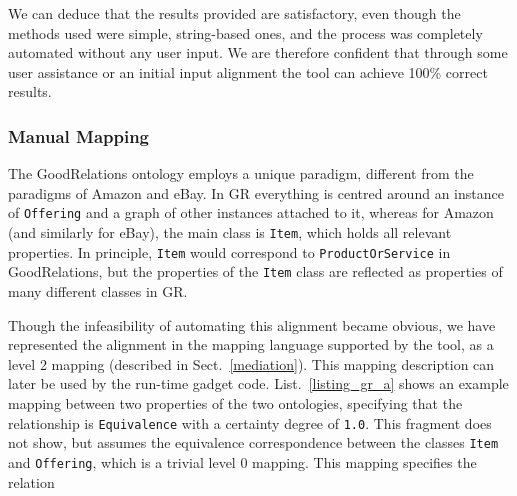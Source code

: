 We can deduce that the results provided are satisfactory, even though the methods used were simple, string-based ones, and the process was completely automated without any user input.
We are therefore confident that through some user assistance or an initial input alignment the tool can achieve 100\% correct results.



\subsubsection{Manual Mapping} %
\label{sub:manual_mapping}

The GoodRelations ontology employs a unique paradigm, different from the paradigms of Amazon and eBay. In GR everything is centred around an instance of \texttt{Offering} and a graph of other instances attached to it, whereas for Amazon (and similarly for eBay), the main class is \texttt{Item}, which holds all relevant properties. In principle, \texttt{Item} would correspond to \texttt{ProductOrService} in GoodRelations, but the properties of the \texttt{Item} class are reflected as properties of many different classes in GR. 

Though the infeasibility of automating this alignment became obvious, we have represented the alignment in the mapping language supported by the tool, as a level 2 mapping (described in Sect.~\ref{mediation}).
This mapping description can later be used by the run-time gadget code. List.~\ref{listing_gr_a} shows an example mapping between two properties of the two ontologies, specifying that the relationship is \texttt{Equivalence} with a certainty degree of \texttt{1.0}. This fragment does not show, but assumes the equivalence correspondence between the classes \texttt{Item} and \texttt{Offering}, which is a trivial level 0 mapping. This mapping specifies the relation

